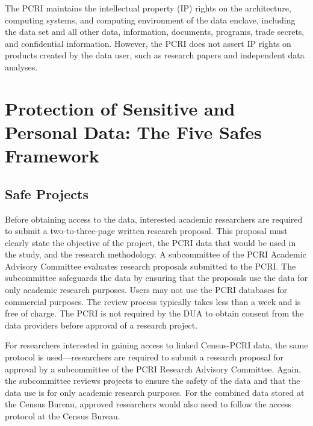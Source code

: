 The PCRI maintains the intellectual property (IP) rights on the architecture, computing systems, and computing environment of the data enclave, including the data set and all other data, information, documents, programs, trade secrets, and confidential information. However, the PCRI does not assert IP rights on products created by the data user, such as research papers and independent data analyses.

\hypertarget{protection-of-sensitive-and-personal-data-the-five-safes-framework-2}{%
\section{Protection of Sensitive and Personal Data: The Five Safes Framework}\label{protection-of-sensitive-and-personal-data-the-five-safes-framework-2}}

\hypertarget{safe-projects-2}{%
\subsection{Safe Projects}\label{safe-projects-2}}

Before obtaining access to the data, interested academic researchers are required to submit a two-to-three-page written research proposal. This proposal must clearly state the objective of the project, the PCRI data that would be used in the study, and the research methodology. A subcommittee of the PCRI Academic Advisory Committee evaluates research proposals submitted to the PCRI. The subcommittee safeguards the data by ensuring that the proposals use the data for only academic research purposes. Users may not use the PCRI databases for commercial purposes. The review process typically takes less than a week and is free of charge. The PCRI is not required by the DUA to obtain consent from the data providers before approval of a research project.

For researchers interested in gaining access to linked Census-PCRI data, the same protocol is used---researchers are required to submit a research proposal for approval by a subcommittee of the PCRI Research Advisory Committee. Again, the subcommittee reviews projects to ensure the safety of the data and that the data use is for only academic research purposes. For the combined data stored at the Census Bureau, approved researchers would also need to follow the access protocol at the Census Bureau.

